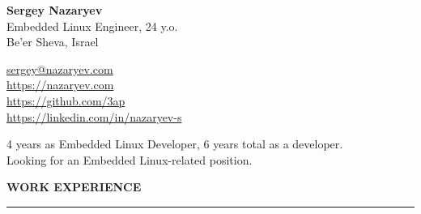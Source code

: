 \documentclass[hidelinks]{resume} %
\begin{document}
\begin{minipage}[t]{0.70\textwidth}
{\Huge \textbf{Sergey Nazaryev}}\vspace{2mm}\\
{Embedded Linux Engineer, 24 y.o.}\\
{Be'er Sheva, Israel \vspace{2mm}}\\

\end{minipage}
\begin{minipage}[t]{0.82\textwidth}
\vspace{-5mm}
{\small \faEnvelopeO} {\small \href{mailto:sergey@nazaryev.com}{sergey@nazaryev.com}}\\
{\small \faLink} {\small \href{https://nazaryev.com}{https://nazaryev.com}}\\
{\small \faGithub} {\small \href{https://github.com/3ap}{https://github.com/3ap}}\\
{\small \faLinkedin} {\small \href{https://www.linkedin.com/in/nazaryev-s/}{https://linkedin.com/in/nazaryev-s}}
\end{minipage} \vspace{-7mm}

{\small
4 years as Embedded Linux Developer, 6 years total as a developer.\\
Looking for an Embedded Linux-related position.
}


\sectionskip
\MakeUppercase{\bf Work experience}
\sectionlineskip
\hrule
\end{document}
